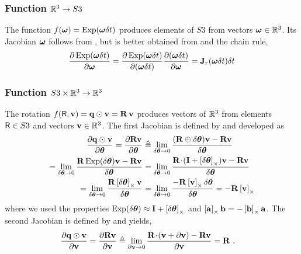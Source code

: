 \subsubsection{Function $\bbR^3\to S3$} 
\label{sec:jac_R3toSO3}

The function $f(\bw) = \Exp(\bw\dt)$ produces elements of $S3$ from vectors $\bw\in\bbR^3$. 
Its Jacobian \wrt $\bw$ follows from , but is better obtained from  and the chain rule,
%
\begin{align*}
\dpar{\Exp(\bw\dt)}{\bw}
= \dpar{\Exp(\bw\dt)}{(\bw\dt)}\dpar{(\bw\dt)}{\bw} 
= \bfJ_r(\bw\dt)\dt
\end{align*}
%


\subsubsection{Function $S3\times\bbR^3\to\bbR^3$} 
\label{sec:jac_SO3xR3toR3}

The rotation $f(\sR,\bfv) = \bfq\od\bfv = \bfR\,\bfv$ produces vectors of $\bbR^3$ from elements $\sR\in S3$ and vectors $\bfv\in\bbR^3$. The first Jacobian is defined by  and developed as
%
\begin{align*}
\dpar{\bfq\od\bfv}{\bth} = \dpar{\bfR\bfv}{\bth} 
&\te \lim_{\delta\bth\to0}\frac{(\bfR\oplus\delta\bth)\bfv-\bfR\bfv}{\delta\bth} \\
= \lim_{\delta\bth\to0}\frac{\bfR\Exp(\delta\bth)\bfv-\bfR\bfv}{\delta\bth} 
&= \lim_{\delta\bth\to0}\frac{\bfR\tdot(\bfI+\hatx{\delta\bth})\bfv-\bfR\bfv}{\delta\bth} \\
= \lim_{\delta\bth\to0}\frac{\bfR\hatx{\delta\bth}\bfv}{\delta\bth} 
&= \lim_{\delta\bth\to0}\frac{-\bfR\hatx{\bfv}\delta\bth}{\delta\bth} 
= -\bfR\hatx{\bfv} 
\end{align*}
%
where we used the properties $\Exp(\dth) \approx \bfI + \hatx{\dth}$ and  $\hatx{\bfa}\bfb = -\hatx{\bfb}\bfa$. 
The second Jacobian is defined by  and yields,
%
\begin{align*}
\dpar{\bfq\od\bfv}{\bfv} = \dpar{\bfR\bfv}{\bfv} 
&\te \lim_{\partial\bfv\to0}\frac{\bfR\tdot(\bfv+\partial\bfv)-\bfR\bfv}{\partial\bfv} 
= \bfR
~.
\end{align*}





